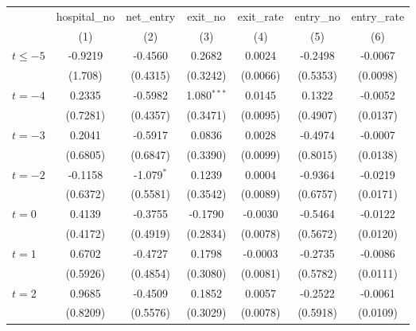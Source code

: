 \begingroup
\centering
\begin{tabular}{lcccccc}
   \toprule
                          & hospital\_no  & net\_entry   & exit\_no      & exit\_rate  & entry\_no  & entry\_rate \\    
                          & (1)           & (2)          & (3)           & (4)         & (5)        & (6)\\  
   \midrule 
   $t \leq -5$            & -0.9219       & -0.4560      & 0.2682        & 0.0024      & -0.2498    & -0.0067\\   
                          & (1.708)       & (0.4315)     & (0.3242)      & (0.0066)    & (0.5353)   & (0.0098)\\   
   $t = -4$               & 0.2335        & -0.5982      & 1.080$^{***}$ & 0.0145      & 0.1322     & -0.0052\\   
                          & (0.7281)      & (0.4357)     & (0.3471)      & (0.0095)    & (0.4907)   & (0.0137)\\   
   $t = -3$               & 0.2041        & -0.5917      & 0.0836        & 0.0028      & -0.4974    & -0.0007\\   
                          & (0.6805)      & (0.6847)     & (0.3390)      & (0.0099)    & (0.8015)   & (0.0138)\\   
   $t = -2$               & -0.1158       & -1.079$^{*}$ & 0.1239        & 0.0004      & -0.9364    & -0.0219\\   
                          & (0.6372)      & (0.5581)     & (0.3542)      & (0.0089)    & (0.6757)   & (0.0171)\\   
   $t = 0$                & 0.4139        & -0.3755      & -0.1790       & -0.0030     & -0.5464    & -0.0122\\   
                          & (0.4172)      & (0.4919)     & (0.2834)      & (0.0078)    & (0.5672)   & (0.0120)\\   
   $t = 1$                & 0.6702        & -0.4727      & 0.1798        & -0.0003     & -0.2735    & -0.0086\\   
                          & (0.5926)      & (0.4854)     & (0.3080)      & (0.0081)    & (0.5782)   & (0.0111)\\   
   $t = 2$                & 0.9685        & -0.4509      & 0.1852        & 0.0057      & -0.2522    & -0.0061\\   
                          & (0.8209)      & (0.5576)     & (0.3029)      & (0.0078)    & (0.5918)   & (0.0109)\\   

\end{tabular}
